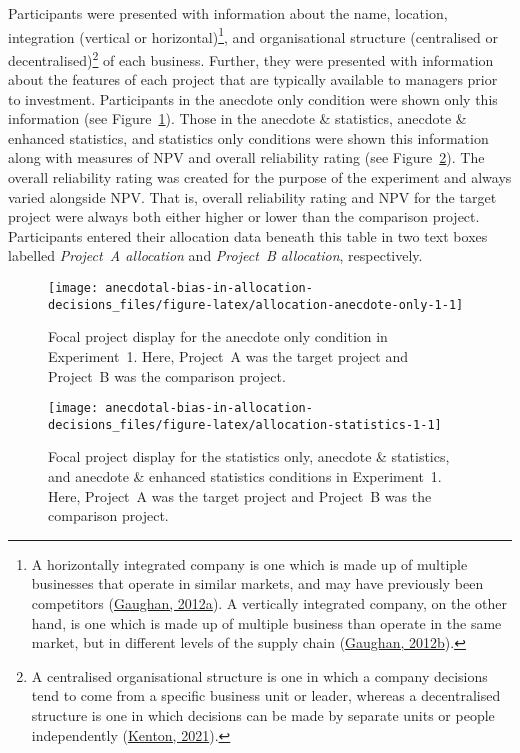 \documentclass[
  man, donotrepeattitle,floatsintext]{apa7}
\theoremstyle{definition}
\theoremstyle{definition}
\theoremstyle{definition}
\theoremstyle{definition}
\theoremstyle{remark}
\begin{document}
Participants were presented with information about the name, location,
integration (vertical or horizontal)\footnote{A horizontally integrated company is one which is made up of
  multiple businesses that operate in similar markets, and may have previously
  been competitors (\protect\hyperlink{ref-gaughan2012}{Gaughan, 2012a}). A vertically integrated company, on the other
  hand, is one which is made up of multiple business than operate in the same
  market, but in different levels of the supply chain (\protect\hyperlink{ref-gaughan2012a}{Gaughan, 2012b}).}, and organisational structure
(centralised or decentralised)\footnote{A centralised organisational structure is one in which a company
  decisions tend to come from a specific business unit or leader, whereas a
  decentralised structure is one in which decisions can be made by separate units
  or people independently (\protect\hyperlink{ref-kenton2021}{Kenton, 2021}).} of each business. Further, they were
presented with information about the features of each project that are typically
available to managers prior to investment. Participants in the anecdote only
condition were shown only this information (see
Figure~\ref{fig:allocation-anecdote-only-1}). Those
in the anecdote \& statistics, anecdote \& enhanced statistics, and statistics
only conditions were shown this information along with measures of NPV and
overall reliability rating (see
Figure~\ref{fig:allocation-statistics-1}). The
overall reliability rating was created for the purpose of the experiment and
always varied alongside NPV. That is, overall reliability rating and NPV for the
target project were always both either higher or lower than the comparison
project. Participants entered their allocation data beneath this table in two
text boxes labelled \emph{Project~A allocation} and \emph{Project~B allocation},
respectively.



\begin{figure}
\texttt{[image: anecdotal-bias-in-allocation-decisions\_files/figure-latex/allocation-anecdote-only-1-1]} \caption{Focal project display for the anecdote only condition in Experiment~1. Here, Project~A was the target project and Project~B was the comparison project.}\label{fig:allocation-anecdote-only-1}
\end{figure}



\begin{figure}
\texttt{[image: anecdotal-bias-in-allocation-decisions\_files/figure-latex/allocation-statistics-1-1]} \caption{Focal project display for the statistics only, anecdote \& statistics, and anecdote \& enhanced statistics conditions in Experiment~1. Here, Project~A was the target project and Project~B was the comparison project.}\label{fig:allocation-statistics-1}
\end{figure}
\end{document}
